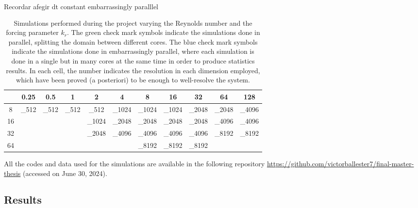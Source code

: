 \documentclass[../main.tex]{subfiles}
\begin{document}
Recordar afegir dt constant embarrassingly paralllel

\begin{table}[ht]
	\centering
	\def\tickgreen{\textcolor{color_green3}{\ding{51}}}
	\def\tickblue{\textcolor{color_blue3}{\ding{51}}}
	\setlength{\tabcolsep}{5pt}
	\renewcommand{\arraystretch}{1.5}
	\begin{tabular}{c|cccccccccc}
		\diagbox[width=\dimexpr \textwidth/16+2\tabcolsep\relax, height=1cm]{$k_r$}{$\Re$} & 0.25             & 0.5              & 1                & 2                         & 4                          & 8                          & 16                         & 32                         & 64                & 128               \\
		\hline
		8                                                                                  & \tickgreen_{512} & \tickgreen_{512} & \tickgreen_{512} & \tickgreen\tickblue_{512} & \tickgreen\tickblue_{1024} & \tickgreen\tickblue_{1024} & \tickgreen\tickblue_{1024} & \tickgreen\tickblue_{2048} & \tickgreen_{2048} & \tickgreen_{4096} \\
		16                                                                                 &                  &                  &                  & \tickblue_{1024}          & \tickblue_{2048}           & \tickgreen\tickblue_{2048} & \tickgreen\tickblue_{2048} & \tickgreen\tickblue_{2048} & \tickgreen_{4096} & \tickgreen_{4096} \\
		32                                                                                 &                  &                  &                  & \tickblue_{2048}          & \tickblue_{4096}           & \tickgreen\tickblue_{4096} & \tickgreen\tickblue_{4096} & \tickgreen\tickblue_{4096} & \tickgreen_{8192} & \tickgreen_{8192} \\
		64                                                                                 &                  &                  &                  &                           &                            & \tickgreen_{8192}          & \tickgreen_{8192}          & \tickgreen_{8192}          &                   &                   \\
	\end{tabular}
	\caption{Simulations performed during the project varying the Reynolds number and the forcing parameter $k_r$. The green check mark symbols indicate the simulations done in parallel, splitting the domain between different cores. The blue check mark symbols indicate the simulations done in embarrassingly parallel, where each simulation is done in a single but in many cores at the same time in order to produce statistics results. In each cell, the number indicates the resolution in each dimension employed, which have been proved (a posteriori) to be enough to well-resolve the system.}
	\label{tab:simulations}
\end{table}

All the codes and data used for the simulations are available in the following repository \url{https://github.com/victorballester7/final-master-thesis} (accessed on June 30, 2024).

\subsection{Results}\label{sec:results}
\end{document}
